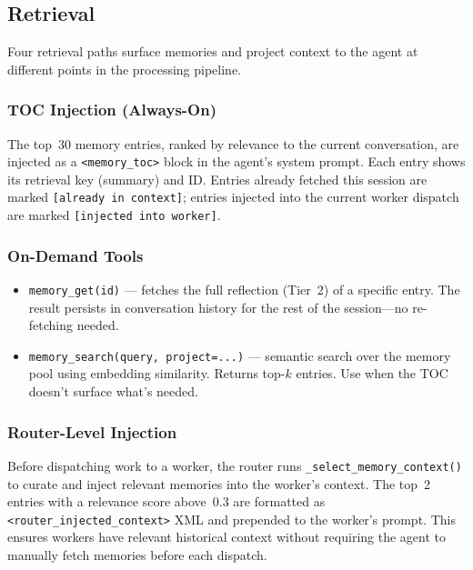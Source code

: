 \documentclass[11pt,a4paper]{article}
\newcommand{\code}[1]{\texttt{#1}}
\begin{document}
\subsection{Retrieval}

Four retrieval paths surface memories and project context to the agent
at different points in the processing pipeline.

\subsubsection{TOC Injection (Always-On)}

The top~30 memory entries, ranked by relevance to the current
conversation, are injected as a \code{<memory\_toc>} block in the
agent's system prompt. Each entry shows its retrieval key (summary) and
ID. Entries already fetched this session are marked
\code{[already in context]}; entries injected into the current worker
dispatch are marked \code{[injected into worker]}.

\subsubsection{On-Demand Tools}

\begin{itemize}[nosep]
  \item \code{memory\_get(id)} --- fetches the full reflection (Tier~2)
        of a specific entry. The result persists in conversation history
        for the rest of the session---no re-fetching needed.
  \item \code{memory\_search(query, project=...)} --- semantic search
        over the memory pool using embedding similarity. Returns top-$k$
        entries. Use when the TOC doesn't surface what's needed.
\end{itemize}

\subsubsection{Router-Level Injection}

Before dispatching work to a worker, the router runs
\code{\_select\_memory\_context()} to curate and inject relevant
memories into the worker's context. The top~2 entries with a relevance
score above~0.3 are formatted as \code{<router\_injected\_context>} XML
and prepended to the worker's prompt. This ensures workers have relevant
historical context without requiring the agent to manually fetch
memories before each dispatch.
\end{document}
